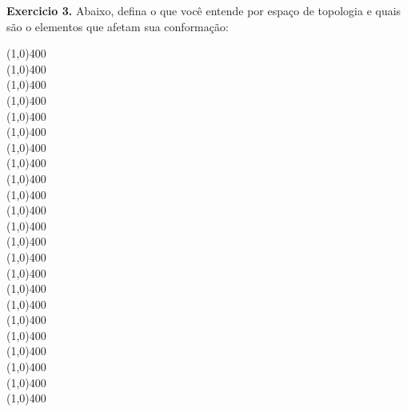 \begin{refsection}
\begin{blackBlock}{\textbf{Exercicio 3.}}\label{tut3:ex:3.\arabic{ex}}
	Abaixo, defina o que você entende por espaço de topologia e quais são o elementos que afetam sua conformação:
  \begin{center}
  \line(1,0){400}\\
  \line(1,0){400}\\
  \line(1,0){400}\\
  \line(1,0){400}\\
  \line(1,0){400}\\
  \line(1,0){400}\\
  \line(1,0){400}\\
  \line(1,0){400}\\
  \line(1,0){400}\\
  \line(1,0){400}\\
  \line(1,0){400}\\
  \line(1,0){400}\\
  \line(1,0){400}\\
  \line(1,0){400}\\
  \line(1,0){400}\\
  \line(1,0){400}\\
  \line(1,0){400}\\
  \line(1,0){400}\\
  \line(1,0){400}\\
  \line(1,0){400}\\
  \line(1,0){400}\\
  \line(1,0){400}\\
  \line(1,0){400}\\
 
 \end{center}


\end{blackBlock}





\end{refsection}
